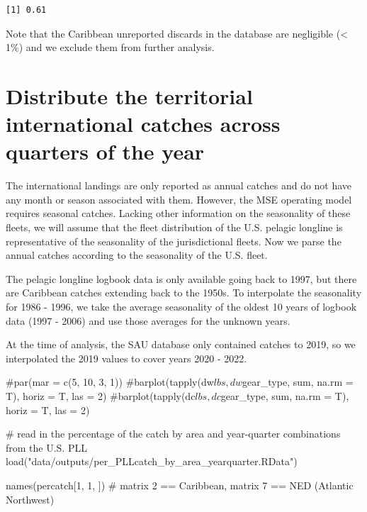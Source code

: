 \documentclass[
  letterpaper,
  oneside,
  open=any]{scrbook}
\newenvironment{Shaded}{\begin{snugshade}}{\end{snugshade}}
\newcommand{\CommentTok}[1]{\textcolor[rgb]{0.37,0.37,0.37}{#1}}
\newcommand{\DecValTok}[1]{\textcolor[rgb]{0.68,0.00,0.00}{#1}}
\newcommand{\FunctionTok}[1]{\textcolor[rgb]{0.28,0.35,0.67}{#1}}
\newcommand{\NormalTok}[1]{\textcolor[rgb]{0.00,0.23,0.31}{#1}}
\newcommand{\StringTok}[1]{\textcolor[rgb]{0.13,0.47,0.30}{#1}}
\begin{document}
\begin{verbatim}
[1] 0.61
\end{verbatim}

Note that the Caribbean unreported discards in the database are
negligible (\textless{} 1\%) and we exclude them from further analysis.

\section{Distribute the territorial international catches across
quarters of the
year}\label{distribute-the-territorial-international-catches-across-quarters-of-the-year}

The international landings are only reported as annual catches and do
not have any month or season associated with them. However, the MSE
operating model requires seasonal catches. Lacking other information on
the seasonality of these fleets, we will assume that the fleet
distribution of the U.S. pelagic longline is representative of the
seasonality of the jurisdictional fleets. Now we parse the annual
catches according to the seasonality of the U.S. fleet.

The pelagic longline logbook data is only available going back to 1997,
but there are Caribbean catches extending back to the 1950s. To
interpolate the seasonality for 1986 - 1996, we take the average
seasonality of the oldest 10 years of logbook data (1997 - 2006) and use
those averages for the unknown years.

At the time of analysis, the SAU database only contained catches to
2019, so we interpolated the 2019 values to cover years 2020 - 2022.

\begin{Shaded}
\begin{Highlighting}[]
\CommentTok{\#par(mar = c(5, 10, 3, 1))}
\CommentTok{\#barplot(tapply(dw$lbs, dw$gear\_type, sum, na.rm = T), horiz = T, las = 2)}
\CommentTok{\#barplot(tapply(dc$lbs, dc$gear\_type, sum, na.rm = T), horiz = T, las = 2)}

\CommentTok{\# read in the percentage of the catch by area and year{-}quarter combinations from the U.S. PLL}
\FunctionTok{load}\NormalTok{(}\StringTok{"data/outputs/per\_PLLcatch\_by\_area\_yearquarter.RData"}\NormalTok{)  }

\FunctionTok{names}\NormalTok{(percatch[}\DecValTok{1}\NormalTok{, }\DecValTok{1}\NormalTok{, ]) }\CommentTok{\# matrix 2 == Caribbean, matrix 7 == NED (Atlantic Northwest)}
\end{Highlighting}
\end{Shaded}
\end{document}
